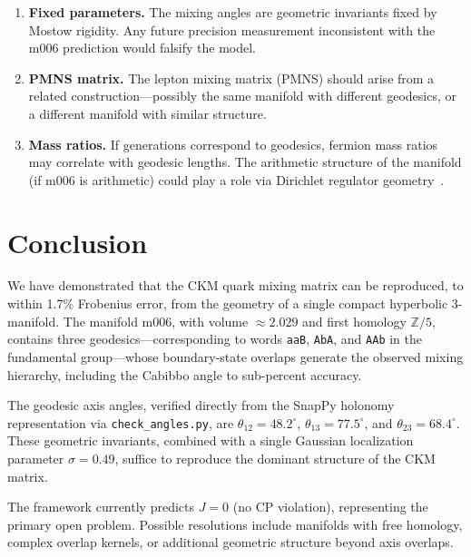 \documentclass[epjc3]{svjour3}
\begin{document}
\begin{enumerate}
\item \textbf{Fixed parameters.} The mixing angles are geometric 
invariants fixed by Mostow rigidity. Any future precision 
measurement inconsistent with the m006 prediction would falsify the 
model.

\item \textbf{PMNS matrix.} The lepton mixing matrix (PMNS) should 
arise from a related construction---possibly the same manifold with 
different geodesics, or a different manifold with similar structure.

\item \textbf{Mass ratios.} If generations correspond to geodesics, 
fermion mass ratios may correlate with geodesic lengths. The arithmetic 
structure of the manifold (if m006 is arithmetic) could play a role 
via Dirichlet regulator geometry~\cite{Neukirch1999}.
\end{enumerate}

\section{Conclusion}
\label{sec:conclusion}

We have demonstrated that the CKM quark mixing matrix can be reproduced, 
to within 1.7\% Frobenius error, from the geometry of a single compact 
hyperbolic 3-manifold. The manifold m006, with volume $\approx 2.029$ 
and first homology $\mathbb{Z}/5$, contains three geodesics---corresponding 
to words \texttt{aaB}, \texttt{AbA}, and \texttt{AAb} in the fundamental 
group---whose boundary-state overlaps generate the observed mixing 
hierarchy, including the Cabibbo angle to sub-percent accuracy.

The geodesic axis angles, verified directly from the SnapPy holonomy
representation via \texttt{check\_angles.py}, are
$\theta_{12} = 48.2^\circ$, $\theta_{13} = 77.5^\circ$,
and $\theta_{23} = 68.4^\circ$. These geometric invariants, combined
with a single Gaussian localization parameter $\sigma = 0.49$,
suffice to reproduce the dominant structure of the CKM matrix.

The framework currently predicts $J = 0$ (no CP violation), 
representing the primary open problem. Possible resolutions include 
manifolds with free homology, complex overlap kernels, or additional 
geometric structure beyond axis overlaps.
\end{document}
